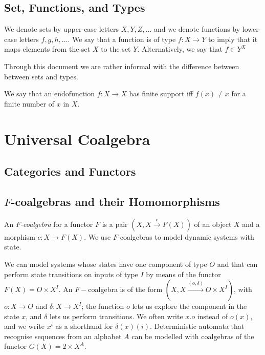 \subsection{Set, Functions, and Types}
We denote sets by upper-case letters $X,Y,Z,\ldots$ and we denote functions by lower-case letters $f,g,h,\ldots$. We say that a function is of type $f\colon X\rightarrow Y$ to imply that it maps elements from the set $X$ to the set $Y$. Alternatively, we say that $f\in Y^X$

Through this document we are rather informal with the difference between between sets and types.  

We say that an endofunction $f\colon X \rightarrow X$ has finite support iff $f(x)\neq x$ for a finite number of $x$ in $X$.
\section{Universal Coalgebra}
\label{sec:Preliminaries:Coalgebras}
\subsection{Categories and Functors}
\subsection{$F$-coalgebras and their Homomorphisms}
An \emph{$F$-coalgebra} for a functor $F$ is a pair $(X,X\xrightarrow{c}F(X))$ of an object $X$ and a morphism $c\colon X\rightarrow F(X)$. We use $F$-coalgebras to model dynamic systems with state. 
\begin{example}
We can model systems whose states have one component of type $O$ and that can perform state transitions on inputs of type $I$ by means of the functor $F(X)=O\times X^I$. An $F-$coalgebra is of the form $(X,X\xrightarrow{(o,\delta)}O\times X^I)$, with $o\colon X\rightarrow O$ and $\delta\colon X\rightarrow X^I$; the function $o$ lets us explore the component in the state $x$, and $\delta$ lets us perform transitions. We often write $x.o$ instead of $o(x)$, and we write $x^i$ as a shorthand for $\delta(x)(i)$. Deterministic automata that recognise sequences from an alphabet $A$ can be modelled with coalgebras of the functor $G(X)=2\times X^A$.
\end{example}
